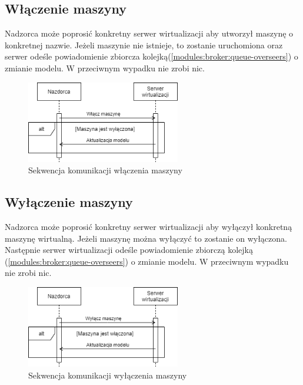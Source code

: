 \documentclass[../opis-rozwiazania.tex]{subfiles}
\begin{document}
\subsection{Włączenie maszyny}

Nadzorca może poprosić konkretny serwer wirtualizacji aby utworzył maszynę o konkretnej nazwie.
Jeżeli maszynie nie istnieje, to zostanie uruchomiona oraz serwer odeśle powiadomienie zbiorcza kolejką(\ref{modules:broker:queue-overseers}) o zmianie modelu.
W przeciwnym wypadku nie zrobi nic.

\begin{figure}[H]
    \centering
    \includegraphics[width=0.6\textwidth]{../diagrams/sequence_diagrams/wlaczenie_maszyny.png}
    \caption{Sekwencja komunikacji włączenia maszyny}
    \label{figure:diagrams:sequence_diagrams:wlaczenie_maszyny}
\end{figure}

\subsection{Wyłączenie maszyny}

Nadzorca może poprosić konkretny serwer wirtualizacji aby wyłączył konkretną maszynę wirtualną.
Jeżeli maszynę można wyłączyć to zostanie on wyłączona.
Następnie serwer wirtualizacji odeśle powiadomienie zbiorczą kolejką (\ref{modules:broker:queue-overseers}) o zmianie modelu.
W przeciwnym wypadku nie zrobi nic.

\begin{figure}[H]
    \centering
    \includegraphics[width=0.6\textwidth]{../diagrams/sequence_diagrams/wylaczenie_maszyny.png}
    \caption{Sekwencja komunikacji wyłączenia maszyny}
    \label{figure:diagrams:sequence_diagrams:wylaczenie_maszyny}
\end{figure}
\end{document}
